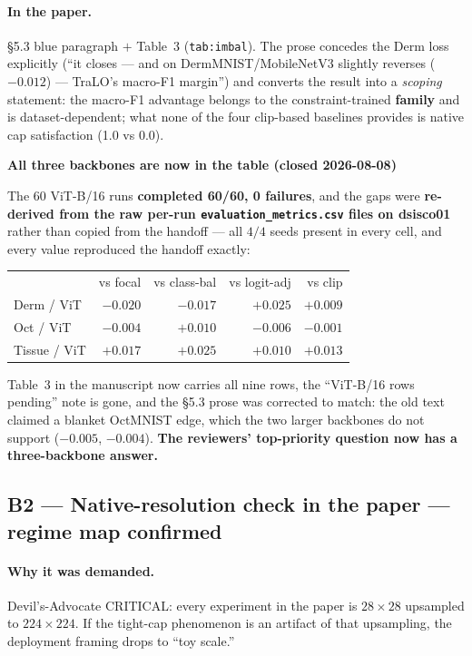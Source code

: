 \documentclass[11pt,a4paper]{article}
\newenvironment{callout}[1]
  {\par\medskip\noindent\begin{lrbox}{\calloutbox}%
   \begin{minipage}{\dimexpr\linewidth-20pt\relax}%
   \textbf{#1}\par\smallskip}
  {\end{minipage}\end{lrbox}%
   \setlength{\fboxsep}{10pt}%
   \colorbox{boxgrey}{\usebox{\calloutbox}}\par\medskip}
\begin{document}
\paragraph{In the paper.} \S5.3 blue paragraph $+$ Table~3 (\texttt{tab:imbal}). The prose concedes
the Derm loss explicitly (``it closes --- and on DermMNIST/MobileNetV3 slightly reverses
($-0.012$) --- TraLO's macro-F1 margin'') and converts the result into a \emph{scoping} statement:
the macro-F1 advantage belongs to the constraint-trained \textbf{family} and is dataset-dependent;
what none of the four clip-based baselines provides is native cap satisfaction (1.0 vs 0.0).

\begin{callout}{\textcolor{okgreen}{All three backbones are now in the table (closed 2026-08-08)}}
The 60 ViT-B/16 runs \textbf{completed 60/60, 0 failures}, and the gaps were \textbf{re-derived from
the raw per-run \texttt{evaluation\_metrics.csv} files on dsisco01} rather than copied from the
handoff --- all $4/4$ seeds present in every cell, and every value reproduced the handoff exactly:

\smallskip
\begin{tabular}{@{}l r r r r@{}}
             & vs focal & vs class-bal & vs logit-adj & vs clip \\
Derm / ViT   & $-0.020$ & $-0.017$ & $+0.025$ & $+0.009$ \\
Oct / ViT    & $-0.004$ & $+0.010$ & $-0.006$ & $-0.001$ \\
Tissue / ViT & $+0.017$ & $+0.025$ & $+0.010$ & $+0.013$ \\
\end{tabular}
\smallskip

Table~3 in the manuscript now carries all nine rows, the ``ViT-B/16 rows pending'' note is gone, and
the \S5.3 prose was corrected to match: the old text claimed a blanket OctMNIST edge, which the two
larger backbones do not support ($-0.005$, $-0.004$). \textbf{The reviewers' top-priority question
now has a three-backbone answer.}
\end{callout}

\subsection*{B2 --- Native-resolution check
\hfill\normalsize\textcolor{okgreen}{\textbf{in the paper --- regime map confirmed}}}

\paragraph{Why it was demanded.} Devil's-Advocate CRITICAL: every experiment in the paper is
$28\times28$ upsampled to $224\times224$. If the tight-cap phenomenon is an artifact of that
upsampling, the deployment framing drops to ``toy scale.''
\end{document}
